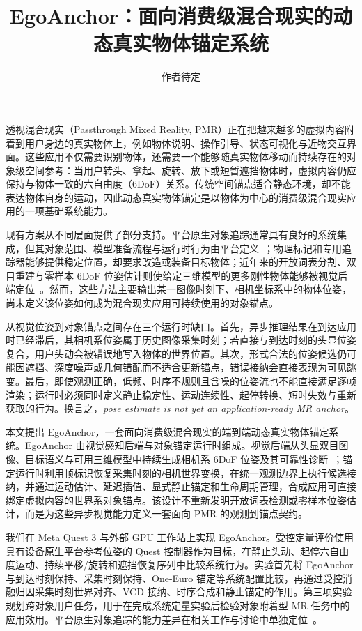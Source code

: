 \documentclass[review]{vgtc}
\title{EgoAnchor：面向消费级混合现实的动态真实物体锚定系统}
\author{作者待定}
\begin{document}
\label{sec:introduction}
\maketitle

透视混合现实（Passthrough Mixed Reality, PMR）正在把越来越多的虚拟内容附着到用户身边的真实物体上，例如物体说明、操作引导、状态可视化与近物交互界面。这些应用不仅需要识别物体，还需要一个能够随真实物体移动而持续存在的对象级空间参考：当用户转头、拿起、旋转、放下或短暂遮挡物体时，虚拟内容仍应保持与物体一致的六自由度（6DoF）关系。传统空间锚点适合静态环境，却不能表达物体自身的运动，因此动态真实物体锚定是以物体为中心的消费级混合现实应用的一项基础系统能力。

现有方案从不同层面提供了部分支持。平台原生对象追踪通常具有良好的系统集成，但其对象范围、模型准备流程与运行时行为由平台定义~\cite{appleObjectAnchor,azureObjectAnchors,vuforiaModelTargets,metaDynamicObjectTracker}；物理标记和专用追踪器能够提供稳定位置，却要求改造或装备目标物体；近年来的开放词表分割、双目重建与零样本 6DoF 位姿估计则使给定三维模型的更多刚性物体能够被视觉后端定位~\cite{posecnn2017,densefusion2019,cosypose2020,megapose2022,foundationpose2023}。然而，这些方法主要输出某一图像时刻下、相机坐标系中的物体位姿，尚未定义该位姿如何成为混合现实应用可持续使用的对象锚点。

从视觉位姿到对象锚点之间存在三个运行时缺口。首先，异步推理结果在到达应用时已经滞后，其相机系位姿属于历史图像采集时刻；若直接与到达时刻的头显位姿复合，用户头动会被错误地写入物体的世界位置。其次，形式合法的位姿候选仍可能因遮挡、深度噪声或几何错配而不适合更新锚点，错误接纳会直接表现为可见跳变。最后，即使观测正确，低频、时序不规则且含噪的位姿流也不能直接满足逐帧渲染；运行时必须同时定义静止稳定性、运动连续性、起停转换、短时失效与重新获取的行为。换言之，\emph{pose estimate is not yet an application-ready MR anchor}。

本文提出 EgoAnchor，一套面向消费级混合现实的端到端动态真实物体锚定系统。EgoAnchor 由视觉感知后端与对象锚定运行时组成。视觉后端从头显双目图像、目标语义与可用三维模型中持续生成相机系 6DoF 位姿及其可靠性诊断~\cite{yoloe2025,cutie2024,foundationstereo2025,foundationpose2023}；锚定运行时利用帧标识恢复采集时刻的相机世界变换，在统一观测边界上执行候选接纳，并通过运动估计、延迟插值、显式静止锚定和生命周期管理，合成应用可直接绑定虚拟内容的世界系对象锚点。该设计不重新发明开放词表检测或零样本位姿估计，而是为这些异步视觉能力定义一套面向 PMR 的观测到锚点契约。

我们在 Meta Quest 3 与外部 GPU 工作站上实现 EgoAnchor。受控定量评价使用具有设备原生平台参考位姿的 Quest 控制器作为目标，在静止头动、起停六自由度运动、持续平移/旋转和遮挡恢复序列中比较系统行为。实验首先将 EgoAnchor 与到达时刻保持、采集时刻保持、One-Euro 锚定等系统配置比较，再通过受控消融归因采集时刻世界对齐、VCD 接纳、时序合成和静止锚定的作用。第三项实验规划跨对象用户任务，用于在完成系统定量实验后检验对象附着型 MR 任务中的应用效用。平台原生对象追踪的能力差异在相关工作与讨论中单独定位~\cite{appleObjectAnchor,azureObjectAnchors,metaDynamicObjectTracker}。
\end{document}
